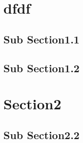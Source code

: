 \documentclass{mycv}
\begin{document}
\section{dfdf}
\subsection{Sub Section1.1}
\subsection{Sub Section1.2}
\section{Section2}
\subsection{Sub Section2.2}
\end{document}
